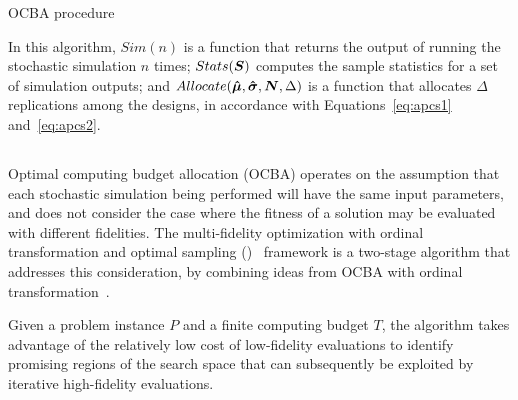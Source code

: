 \begin{algorithm}[h!] 
\caption{OCBA procedure}
\label{alg:ocba}
{\footnotesize
\begin{algorithmic}[1]
 
 
 
\label{while-loop}
   
   
   
   
   
\ENDWHILE
\end{algorithmic}
}
\end{algorithm}

In this algorithm, $Sim(n)$ is a function that returns the output of running the stochastic simulation $n$ times; $Stats(\boldsymbol{S})$ computes the sample statistics for a set of simulation outputs; and $Allocate(\boldsymbol{\hat{\mu}},\boldsymbol{\hat{\sigma}},\boldsymbol{N},\Delta)$ is a function that allocates $\Delta$ replications among the designs, in accordance with Equations~\ref{eq:apcs1} and~\ref{eq:apcs2}.

\subsection{\motos{}}
Optimal computing budget allocation (OCBA) operates on the assumption that each stochastic simulation being performed will have the same input parameters, and does not consider the case where the fitness of a solution may be evaluated with different fidelities. The multi-fidelity optimization with ordinal transformation and optimal sampling (\motos{})~\cite{xu2016mo2tos} framework is a two-stage algorithm that addresses this consideration, by combining ideas from OCBA with ordinal transformation~\cite{xu2014ordinal}.

Given a problem instance $P$ and a finite computing budget $T$, the \motos{} algorithm takes advantage of the relatively low cost of low-fidelity evaluations to identify promising regions of the search space that can subsequently be exploited by iterative high-fidelity evaluations.

